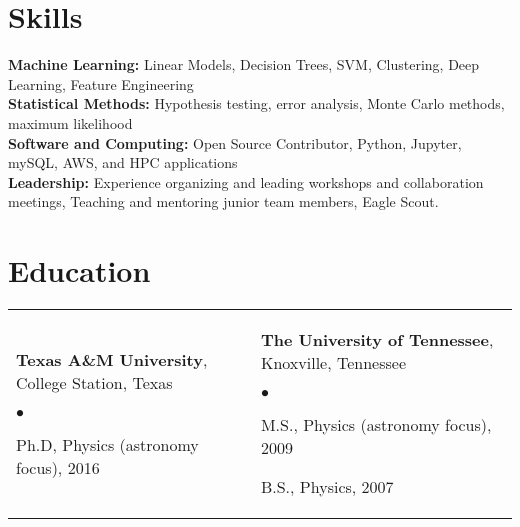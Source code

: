 \documentclass[margin,line, 11pt]{res}
\newenvironment{list2}{
  \begin{list}{$\bullet$}{%
      \setlength{\itemsep}{0in}
      \setlength{\parsep}{0in} \setlength{\parskip}{0in}
      \setlength{\topsep}{0in} \setlength{\partopsep}{0in}
      \setlength{\leftmargin}{0.2in}}}{\end{list}}
\begin{document}
\begin{resume}
\section{Skills}
\textbf{Machine Learning:} Linear Models, Decision Trees, SVM, Clustering, Deep Learning, Feature Engineering\\
\textbf{Statistical Methods:} Hypothesis testing, error analysis, Monte Carlo methods, maximum likelihood\\
\textbf{Software and Computing:} Open Source Contributor, Python, Jupyter, mySQL, AWS, and HPC applications \\
\textbf{Leadership:} Experience organizing and leading workshops and collaboration meetings, Teaching and mentoring junior team members, Eagle Scout. \\
\vspace*{-7mm}

\section{Education}
\begin{tabular}{@{}p{3in}p{3in}}
  \textbf{Texas A\&M University}, College Station, Texas
  \begin{list2}
  	\item Ph.D, Physics (astronomy focus), 2016
  \end{list2} &
  \textbf{The University of Tennessee}, Knoxville, Tennessee
  \begin{list2}
  	\item M.S., Physics (astronomy focus), 2009
  	\item B.S., Physics, 2007
  \end{list2} \\
\end{tabular}
\vspace*{-4mm}

\end{resume}
\end{document}

